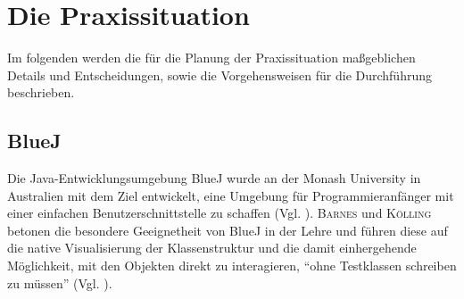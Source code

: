 \documentclass[paper=a4, DIV=13, BCOR=12mm, twoside=on, onecolumn=on, open = any, titlepage =on, parskip =half-, headsepline = on, footsepline = on, chapterprefix = on, sectionprefix = on, appendixprefix = off, fontsize = 11pt, numbers = noenddot, abstract = off]{scrreprt}
\begin{document}
\chapter{Die Praxissituation}
\onehalfspacing
 Im folgenden werden die für die Planung der Praxissituation maßgeblichen Details und Entscheidungen, sowie die Vorgehensweisen für die Durchführung beschrieben. 
\par \singlespacing
 \section{BlueJ}
\onehalfspacing
{}
\label{sec:bluej}
Die Java-Entwicklungsumgebung BlueJ wurde an der Monash University in Australien mit dem Ziel entwickelt, eine Umgebung für Programmieranfänger mit einer einfachen Benutzerschnittstelle zu schaffen (Vgl. \cite[S.14]{barnes:03}). \textsc{Barnes} und \textsc{Kölling} betonen die besondere Geeignetheit von BlueJ in der Lehre und führen diese auf die native Visualisierung der Klassenstruktur und die damit einhergehende Möglichkeit, mit den Objekten direkt zu interagieren, "`ohne Testklassen schreiben zu müssen"' (Vgl. \cite[S.15]{barnes:03}). 


\end{document}
